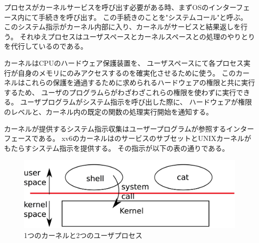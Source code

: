 \documentclass[11pt,a4paper, uplatex]{jsarticle}
\begin{document}
プロセスがカーネルサービスを呼び出す必要がある時、まずOSのインターフェース内にて手続きを呼び出す。
この手続きのことを"システムコール"と呼ぶ。
このシステム指示がカーネル内部に入り、カーネルがサービスと結果返しを行う。
それゆえプロセスはユーザスペースとカーネルスペースとの処理のやりとりを代行しているのである。

カーネルはCPUのハードウェア保護装置を、
ユーザスペースにて各プロセス実行が自身のメモリにのみアクセスするのを確実化させるために使う。
このカーネルはこれらの保護を通過するために求められるハードウェアの権限と共に実行するため、
ユーザのプログラムらがわざわざこれらの権限を使わずに実行できる。
ユーザプログラムがシステム指示を呼び出した際に、
ハードウェアが権限のレベルと、カーネル内の既定の関数の処理実行開始を通知する。

カーネルが提供するシステム指示収集はユーザープログラムが参照するインターフェースである。
xv6のカーネルはのサービスのサブセットとUNIXカーネルがもたらすシステム指示を提供する。
その指示が以下の表の通りである。

\begin{figure}
  \includegraphics[width=\linewidth]{./fig1.jpg}
  \caption{1つのカーネルと2つのユーザプロセス}
  \label{fig0-1}
\end{figure}

\hrulefill
\end{document}
